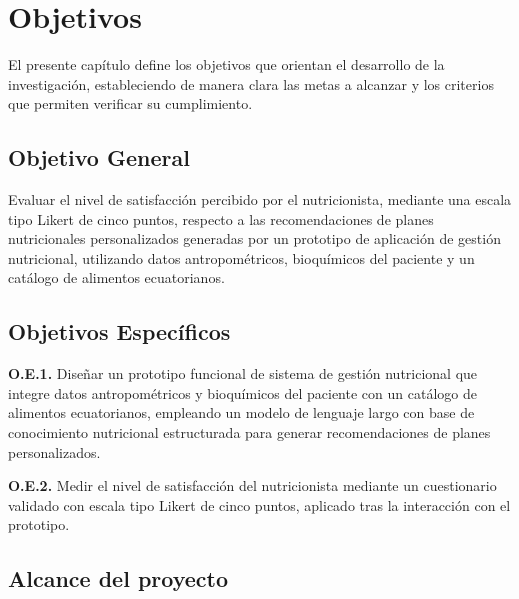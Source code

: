 \clearpage
\section{Objetivos}

El presente capítulo define los objetivos que orientan el desarrollo
de la investigación, estableciendo de manera clara las metas a alcanzar
y los criterios que permiten verificar su cumplimiento.

\subsection{Objetivo General}

Evaluar el nivel de satisfacción percibido por el nutricionista,
mediante una escala tipo Likert de cinco puntos, respecto a las
recomendaciones de planes nutricionales personalizados generadas
por un prototipo de aplicación de gestión nutricional, utilizando datos antropométricos, bioquímicos del paciente y un
catálogo de alimentos ecuatorianos.

\subsection{Objetivos Específicos}

\textbf{O.E.1.} Diseñar un prototipo funcional de sistema de gestión
nutricional que integre datos antropométricos y bioquímicos del
paciente con un catálogo de alimentos ecuatorianos, empleando un
modelo de lenguaje largo con base de conocimiento nutricional estructurada
para generar recomendaciones de planes personalizados.

\medskip

\textbf{O.E.2.} Medir el nivel de satisfacción del nutricionista
mediante un cuestionario validado con escala tipo Likert de cinco
puntos, aplicado tras la interacción con el prototipo.

\subsection{Alcance del proyecto}

